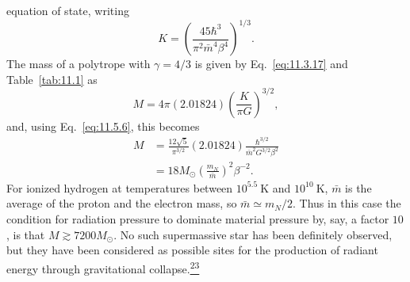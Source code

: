 equation of state, writing
\begin{equation}
  K
  =
  \left(\frac{45\hbar^3}{\pi^2\bar m^4\beta^4}\right)^{1/3}.
  \tag{11.5.6}\label{eq:11.5.6}
\end{equation}
The mass of a polytrope with \(\gamma=4/3\) is given by
Eq.~\eqref{eq:11.3.17} and Table~\ref{tab:11.1} as
\begin{equation}
  M
  =
  4\pi(2.01824)\left(\frac K{\pi G}\right)^{3/2},
  \tag{11.5.7}\label{eq:11.5.7}
\end{equation}
and, using Eq.~\eqref{eq:11.5.6}, this becomes
\begin{equation}
  \begin{split}
  M
  &=
  \frac{12\sqrt5}{\pi^{3/2}}(2.01824)
  \frac{\hbar^{3/2}}{\bar m^2G^{3/2}\beta^2}\\
  &=
  18M_\odot\left(\frac{m_N}{\bar m}\right)^2\beta^{-2}.
  \end{split}
  \tag{11.5.8}\label{eq:11.5.8}
\end{equation}
For ionized hydrogen at temperatures between \(10^{5.5}\ \mathrm{K}\) and
\(10^{10}\ \mathrm{K}\), \(\bar m\) is the average of the proton and the
electron mass, so \(\bar m\simeq m_N/2\). Thus in this case the condition for
radiation pressure to dominate material pressure by, say, a factor \(10\), is
that \(M\gtrsim7200M_\odot\). No such supermassive star has been definitely
observed, but they have been considered as possible sites for the production
of radiant energy through gravitational
collapse.\hyperref[ch11-ref-23]{\textsuperscript{23}}

